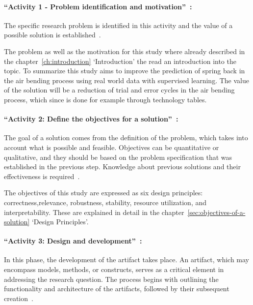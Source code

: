 \paragraph{``Activity 1 - Problem identification and motivation''~\cite[p. 54]{peffers_designscienceresearch_2007}:}
The specific research problem is identified in this activity and the value of a possible solution is
established~\cite[p. 54--55]{peffers_designscienceresearch_2007}.

The problem as well as the motivation for this study where already described in the chapter~\ref{ch:introduction}
`Introduction' the read an introduction into the topic.
To summarize this study aims to improve the prediction of spring back in the air bending process using real world
data with supervised learning.
The value of the solution will be a reduction of trial and error cycles in the air bending process, which since is done
for example through technology tables.

\paragraph{``Activity 2: Define the objectives for a solution''~\cite[p. 55]{peffers_designscienceresearch_2007}:}
The goal of a solution comes from the definition of the problem, which takes into account what is possible and feasible.
Objectives can be quantitative or qualitative, and they should be based on the problem specification that was
established in the previous step.
Knowledge about previous solutions and their effectiveness is required~\cite[p. 55]{peffers_designscienceresearch_2007}.

The objectives of this study are expressed as six design principles:
correctness,relevance, robustness, stability, resource utilization, and interpretability.
These are explained in detail in the chapter~\ref{sec:objectives-of-a-solution} `Design Principles'.

\paragraph{``Activity 3: Design and development''~\cite[p. 55]{peffers_designscienceresearch_2007}:}
In this phase, the development of the artifact takes place.
An artifact, which may encompass models, methods, or constructs, serves as a critical element in addressing the
research question.
The process begins with outlining the functionality and architecture of the artifacts, followed by their subsequent
creation~\cite[p. 55]{peffers_designscienceresearch_2007}.

